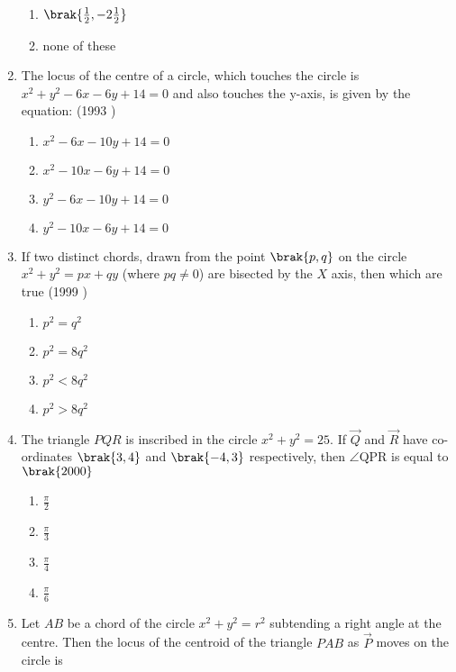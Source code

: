 \begin{enumerate}[label=\thesubsection.\arabic*.,ref=\thesubsection.\theenumi]
\begin{multicols}{2}
\begin{enumerate}
    	\item $\brak{\frac{1}{2}, -2\frac{1}{2}}$
    	\item none of these
    \end{enumerate}
\end{multicols}
    \item The locus of the centre of a circle,  which touches the circle is $x^{2}+y^{2}-6x-6y+14=0$ and also touches the y-axis,  is given by the equation: \hfill {(1993 )}
    \begin{multicols}{2}
\begin{enumerate}
    	\item $x^{2}-6x-10y+14=0$
    	\item $x^{2}-10x-6y+14=0$
    	\item $y^{2}-6x-10y+14=0$
    	\item $y^{2}-10x-6y+14=0$
    \end{enumerate}
\end{multicols}
    \item If two distinct chords,  drawn from the point $\brak{p, q}$ on the circle $x^{2}+y^{2}=px+qy$ (where $pq \neq 0$) are bisected by the $X$ axis,  then which are true
    \hfill {(1999 )}
    \begin{multicols}{2}
\begin{enumerate}
    	\item $p^{2}=q^{2}$
    	\item $p^{2}=8q^{2}$ 
    	\item $p^{2}<8q^{2}$
    	\item $p^{2}>8q^{2}$
    \end{enumerate}
\end{multicols}
        \item The triangle $PQR$ is inscribed in the circle $x^2+y^2=25$. If $\vec{Q}$ and $\vec{R}$ have co-ordinates $\brak{3, 4}$ and $\brak{-4, 3}$ respectively, then $\angle$QPR is equal to  
    \hfill$\brak{2000}$
%
%
    \begin{multicols}{2}
\begin{enumerate}
%
        \item $\frac{\pi}{2}$
        \item $\frac{\pi}{3}$
        \item $\frac{\pi}{4}$
        \item $\frac{\pi}{6}$
    \end{enumerate}
    \end{multicols}
    \item Let $AB$ be a chord of the circle $x^2+y^2=r^2$ subtending a right angle at the centre. Then the locus of the centroid of the triangle $PAB$  as $\vec{P}$ moves on the circle is 

\end{enumerate}

